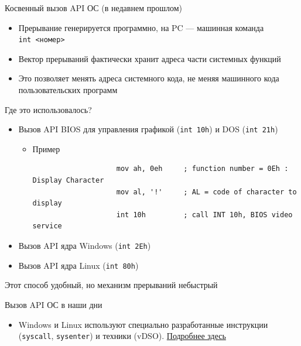 \documentclass[xetex,aspectratio=43]{beamer}
\begin{document}
\begin{frame}[fragile]{Косвенный вызов API ОС (в недавнем прошлом)}
	\begin{itemize}
		\tightlist
		\item
		Прерывание генерируется программно, на PC --- машинная команда
		\texttt{int\ \textless{}номер\textgreater{}}
		\item
		Вектор прерываний фактически хранит адреса части системных функций
		\item
		Это позволяет менять адреса системного кода, не меняя машинного кода
		пользовательских программ
	\end{itemize}

	\begin{block}{Где это использовалось?}
		\begin{itemize}
			\tightlist
			\item
			Вызов API BIOS для управления графикой (\texttt{int 10h}) и DOS
			(\texttt{int 21h})

			\begin{itemize}
				\tightlist
				\item
				Пример

				\begin{verbatim}
                    mov ah, 0eh     ; function number = 0Eh : Display Character
                    mov al, '!'     ; AL = code of character to display
                    int 10h         ; call INT 10h, BIOS video service
				\end{verbatim}
			\end{itemize}
			\item
			Вызов API ядра Windows (\texttt{int 2Eh})
			\item
			Вызов API ядра Linux (\texttt{int 80h})
		\end{itemize}

		Этот способ удобный, но механизм прерываний небыстрый
	\end{block}
\end{frame}

\begin{frame}{Вызов API ОС в наши дни}
	\begin{itemize}
		\item
		Windows и Linux используют специально разработанные инструкции
		(\texttt{syscall}, \texttt{sysenter}) и техники (vDSO). \href{https://habr.com/ru/post/347596/}{Подробнее здесь}
	\end{itemize}
\end{frame}
\end{document}
